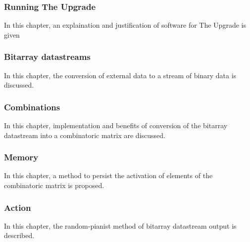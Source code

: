 \subsubsection{Running The Upgrade}
In this chapter, an explaination and justification of software for The Upgrade is given
\subsubsection{Bitarray datastreams}
In this chapter, the conversion of external data to a stream of binary data is discussed.
\subsubsection{Combinations}
In this chapter, implementation and benefits of conversion of the bitarray datastream into a combinatoric matrix are discussed.
\subsubsection{Memory}
In this chapter, a method to persist the activation of  elements of the combinatoric matrix is proposed.
\subsubsection{Action}
In this chapter, the random-pianist method of bitarray datastream output is described.
